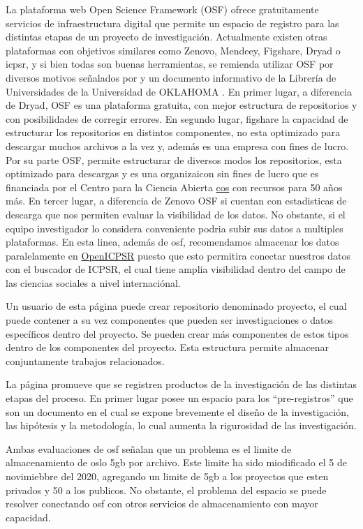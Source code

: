\documentclass[
  14pt,
]{book}
\begin{document}
La plataforma web Open Science Framework (OSF) ofrece gratuitamente servicios de infraestructura digital que permite un espacio de registro para las distintas etapas de un proyecto de investigación. Actualmente existen otras plataformas con objetivos similares como Zenovo, Mendeey, Figshare, Dryad o icpsr, y si bien todas son buenas herramientas, se remienda utilizar OSF por diversos motivos señalados por \citet{kryvokhyzha_best_2019} y un documento informativo de la Librería de Universidades de la Universidad de OKLAHOMA \citet{bibliotecasuniversitarias_Make_2020}. En primer lugar, a diferencia de Dryad, OSF es una plataforma gratuita, con mejor estructura de repositorios y con posibilidades de corregir errores. En segundo lugar, figshare la capacidad de estructurar los repositorios en distintos componentes, no esta optimizado para descargar muchos archivos a la vez y, además es una empresa con fines de lucro. Por su parte OSF, permite estructurar de diversos modos los repositorios, esta optimizado para descargas y es una organizaicon sin fines de lucro que es financiada por el Centro para la Ciencia Abierta \href{https://www.cos.io/}{cos} con recursos para 50 años más. En tercer lugar, a diferencia de Zenovo OSF si cuentan con estadisticas de descarga que nos permiten evaluar la visibilidad de los datos. No obstante, si el equipo investigador lo considera conveniente podria subir sus datos a multiples plataformas. En esta linea, además de osf, recomendamos almacenar los datos paralelamente en \href{https://www.openicpsr.org/openicpsr/workspace?path=openICPSR}{OpenICPSR} puesto que esto permitira conectar nuestros datos con el buscador de ICPSR, el cual tiene amplia visibilidad dentro del campo de las ciencias sociales a nivel internaciónal.

Un usuario de esta página puede crear repositorio denominado proyecto, el cual puede contener a su vez componentes que pueden ser investigaciones o datos específicos dentro del proyecto. Se pueden crear más componentes de estos tipos dentro de los componentes del proyecto. Esta estructura permite almacenar conjuntamente trabajos relacionados.

La página promueve que se registren productos de la investigación de las distintas etapas del proceso. En primer lugar posee un espacio para los ``pre-registros'' que son un documento en el cual se expone brevemente el diseño de la investigación, las hipótesis y la metodología, lo cual aumenta la rigurosidad de las investigación.

Ambas evaluaciones de osf señalan que un problema es el limite de almacenamiento de oslo 5gb por archivo. Este limite ha sido miodificado el 5 de novimiebbre del 2020, agregando un limite de 5gb a los proyectos que esten privados y 50 a los publicos. No obstante, el problema del espacio se puede resolver conectando osf con otros servicios de almacenamiento con mayor capacidad.
\end{document}
